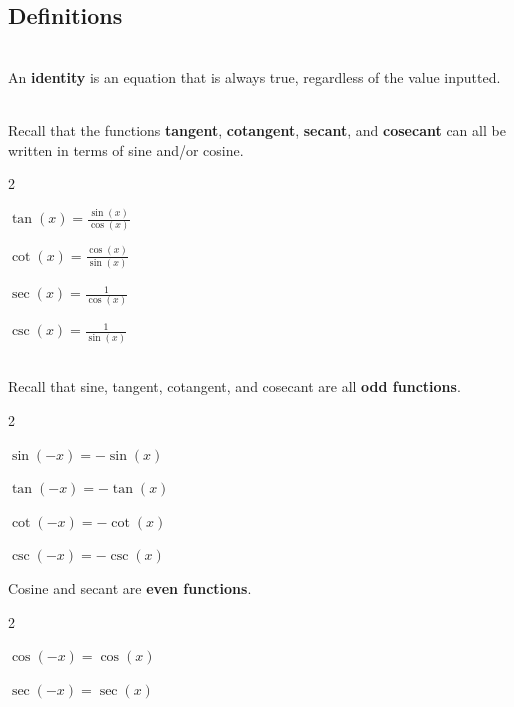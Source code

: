 \subsection*{Definitions} \label{definitions-section-trig-identities}

\begin{myDefinition}[{Identity}]~\\[0.5mm]
	An \textbf{identity} is an equation that is always true, regardless of the value inputted.
\end{myDefinition}

\begin{myDefinition}~\\[0.5mm]
	Recall that the functions \textbf{tangent}, \textbf{cotangent}, \textbf{secant}, and \textbf{cosecant} can all be written in terms of sine and/or cosine.
	\begin{itemize}
	\end{itemize}
\end{myDefinition}

\begin{myDefinition}~\\[0.5mm]
	Recall that sine, tangent, cotangent, and cosecant are all \textbf{odd functions}. 
	\begin{itemize}
		\begin{multicols}{2}
			\item $\sin(-x)=-\sin(x)$
			\item $\tan(-x)=-\tan(x)$
			\item $\cot(-x)=-\cot(x)$
			\item $\csc(-x)=-\csc(x)$
		\end{multicols}
	\end{itemize}
	Cosine and secant are \textbf{even functions}.
	\begin{itemize}
		\begin{multicols}{2}
			\item $\cos(-x)=\cos(x)$
			\item $\sec(-x)=\sec(x)$
		\end{multicols}
	\end{itemize}
\end{myDefinition}


